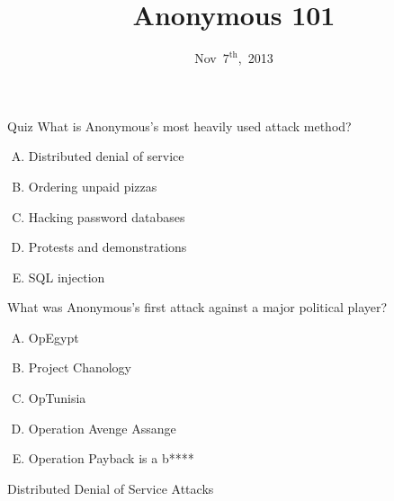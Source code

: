\documentclass{beamer}
\title{Anonymous 101}
\date{Nov~$7^{\text{th}}$,~2013}
\begin{document}
\begin{frame}
\titlepage
\end{frame}

\begin{frame}{Quiz}
%
%
What is Anonymous's most heavily used attack method?
\begin{enumerate}[(A)]
\item<1-2> Distributed denial of service %
\item<1> Ordering unpaid pizzas
\item<1> Hacking password databases
\item<1> Protests and demonstrations
\item<1> SQL injection
\end{enumerate}
What was Anonymous's first attack against a major political player?
\begin{enumerate}[(A)]
\item<1> OpEgypt %
\item<1> Project Chanology %
\item<1> OpTunisia %
\item<1> Operation Avenge Assange %
\item<1-2> Operation Payback is a b**** %
\end{enumerate}
\end{frame}

\begin{frame}{Distributed Denial of Service Attacks}
\begin{center}
\href{http://www.youtube.com/watch?v=xR_lHN8wKHA\#t=2m3s}{}
\end{center}
\end{frame}
\end{document}
